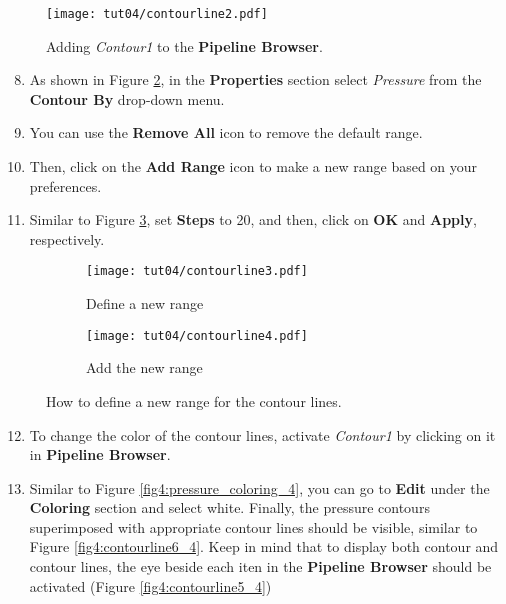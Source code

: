 \begin{figure}[ht]
    \centering
    \texttt{[image: tut04/contourline2.pdf]}
    \caption{Adding \textit{Contour1} to the \textbf{Pipeline Browser}.}
    \label{fig4:contourline2_4}
\end{figure}
\begin{enumerate}[label=\arabic*)]
	\setcounter{enumi}{7}
	\item As shown in Figure \ref{fig4:contourby_4 a}, in the \textbf{Properties} section select \textit{Pressure} from the \textbf{Contour By} drop-down menu.
	\item You can use the \textbf{Remove All} icon to remove the default range.
	\item Then, click on the \textbf{Add Range} icon to make a new range based on your preferences.
	\item Similar to Figure \ref{fig4:contourby_4 b}, set \textbf{Steps} to 20, and then, click on \textbf{OK} and \textbf{Apply}, respectively.
\end{enumerate}
\begin{figure}[ht]
    \centering
    \begin{subfigure}[b]{.4\textwidth}
        \centering
        \texttt{[image: tut04/contourline3.pdf]}
        \caption{Define a new range}
        \label{fig4:contourby_4 a}
    \end{subfigure}
    \hfill
    \begin{subfigure}[b]{.4\textwidth}
        \centering
        \texttt{[image: tut04/contourline4.pdf]}
        \caption{Add the new range}
        \label{fig4:contourby_4 b}
    \end{subfigure}     
    \caption{How to define a new range for the contour lines.}
    \label{fig4:contourby_4}
\end{figure}
\begin{enumerate}[label=\arabic*)]
	\setcounter{enumi}{11}
	\item To change the color of the contour lines, activate \textit{Contour1} by clicking on it in \textbf{Pipeline Browser}.
	\item Similar to Figure \ref{fig4:pressure_coloring_4}, you can go to \textbf{Edit} under the \textbf{Coloring} section and select white. Finally, the pressure contours superimposed with appropriate contour lines should be visible, similar to Figure \ref{fig4:contourline6_4}. Keep in mind that to display both contour and contour lines, the eye beside each iten in the \textbf{Pipeline Browser} should be activated (Figure \ref{fig4:contourline5_4})
\end{enumerate}

